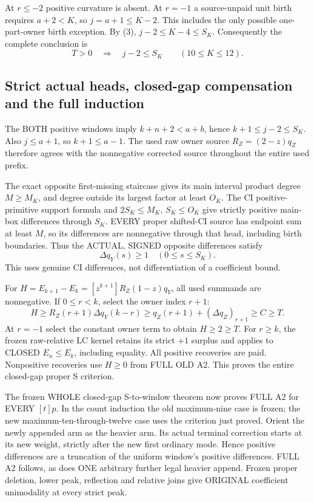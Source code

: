 At $r\le-2$ positive curvature is absent. At $r=-1$ a source-unpaid
unit birth requires $a+2<K$, so $j=a+1\le K-2$. This includes the
only possible one-part-owner birth exception. By (3),
$j-2\le K-4\le S_K$. Consequently the complete conclusion is
\[
 T>0\quad\Longrightarrow\quad j-2\le S_K
          \qquad(10\le K\le12).                       \tag{8}
\]

\subsection{Strict actual heads, closed-gap compensation and the full induction}
The BOTH positive windows imply $k+n+2<a+b$, hence
$k+1\le j-2\le S_K$. Also $j\le a+1$, so $k+1\le a-1$.
The used raw owner source $R_Z=(2-z)q_Z$ therefore agrees with the
nonnegative corrected source throughout the entire used prefix.

The exact opposite first-missing staircase gives its main interval product
degree $M\ge M_K$, and degree outside its largest factor at least $O_K$.
The CI positive-primitive support formula and $2S_K\le M_K$,
$S_K\le O_K$ give strictly positive main-box differences through $S_K$.
EVERY proper shifted-CI source has endpoint sum at least $M$, so its
differences are nonnegative through that head, including birth boundaries.
Thus the ACTUAL, SIGNED opposite differences satisfy
\[
                       \Delta q_Y(s)\ge1\quad(0\le s\le S_K).   \tag{9}
\]
This uses genuine CI differences, not differentiation of a coefficient bound.

For $H=E_{k+1}-E_k=[z^{k+1}]R_Z(1-z)q_Y$, all used summands
are nonnegative. If $0\le r<k$, select the owner index $r+1$:
\[
 H\ge R_Z(r+1)\Delta q_Y(k-r)
 \ge q_Z(r+1)+(\Delta q_Z)_{r+1}\ge C\ge T.
\]
At $r=-1$ select the constant owner term to obtain $H\ge2\ge T$.
For $r\ge k$, the frozen raw-relative LC kernel retains its strict
$+1$ surplus and applies to CLOSED $E_n\le E_k$, including equality.
All positive recoveries are paid. Nonpositive recoveries use $H\ge0$
from FULL OLD A2. This proves the entire closed-gap proper S criterion.

The frozen WHOLE closed-gap S-to-window theorem now proves FULL A2 for
EVERY $[t]p$. In the count induction the old maximum-nine case is frozen;
the new maximum-ten-through-twelve case uses the criterion just proved.
Orient the newly appended arm as the heavier arm. Its actual terminal
correction starts at its new weight, strictly after the new first ordinary
mode. Hence positive differences are a truncation of the uniform window's
positive differences. FULL A2 follows, as does ONE arbitrary further
legal heavier append. Frozen proper deletion, lower peak, reflection and
relative joins give ORIGINAL coefficient unimodality at every strict peak.

